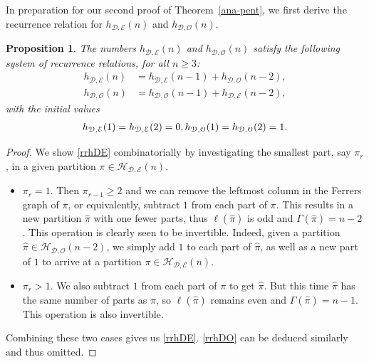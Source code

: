 \documentclass[12pt]{amsart}
\numberwithin{equation}{section}
\theoremstyle{plain}
\newtheorem{proposition}[theorem]{Proposition}
\theoremstyle{definition}
\def\D{\mathcal{D}}
\def\O{\mathcal{O}}
\def\H{\mathcal{H}}
\def\E{\mathcal{E}}
\begin{document}
In preparation for our second proof of Theorem~\ref{ana-pent}, we first derive the recurrence relation for $h_{\D,\E}(n)$ and $h_{\D,\O}(n)$.
\begin{proposition}\label{rr-hDEO}
The numbers $h_{\mathcal{D, E}}(n)$ and $h_{\mathcal{D, O}}(n)$ satisfy the following system of recurrence relations, for all $n\geq 3$:
\begin{align}
h_{\mathcal{D, E}}(n) &=h_{\mathcal{D, E}}(n-1)+h_{\mathcal{D, O}}(n-2),\label{rrhDE}\\
h_{\mathcal{D, O}}(n) &=h_{\mathcal{D, O}}(n-1)+h_{\mathcal{D, E}}(n-2),\label{rrhDO}
\end{align}
with the initial values
\begin{gather}\label{iv}
h_{\D,\E}(1)=h_{\mathcal{D, E}}(2) = 0, h_{\mathcal{D, O}}(1)=h_{\mathcal{D, O}}(2)=1.\notag
\end{gather}
\end{proposition}
\begin{proof}
We show \eqref{rrhDE} combinatorially by investigating the smallest part, say $\pi_r$, in a given partition $\pi\in\H_{\D,\E}(n)$.
\begin{itemize}
\item $\pi_r=1$. Then $\pi_{r-1}\geq 2$ and we can remove the leftmost column in the Ferrers graph of $\pi$, or equivalently, subtract $1$ from each part of $\pi$. This results in a new partition $\hat{\pi}$ with one fewer parts, thus $\ell(\hat{\pi})$ is odd and $\Gamma(\hat{\pi})=n-2$. This operation is clearly seen to be invertible. Indeed, given a partition $\hat{\pi}\in\H_{\D,\O}(n-2)$, we simply add $1$ to each part of $\hat{\pi}$, as well as a new part of $1$ to arrive at a partition $\pi\in\H_{\D,\E}(n)$.
\item $\pi_r>1$. We also subtract $1$ from each part of $\pi$ to get $\hat{\pi}$. But this time $\hat{\pi}$ has the same number of parts as $\pi$, so $\ell(\hat{\pi})$ remains even and $\Gamma(\hat{\pi})=n-1$. This operation is also invertible.
\end{itemize}
Combining these two cases gives us \eqref{rrhDE}. \eqref{rrhDO} can be deduced similarly and thus omitted.
\end{proof}
\end{document}
